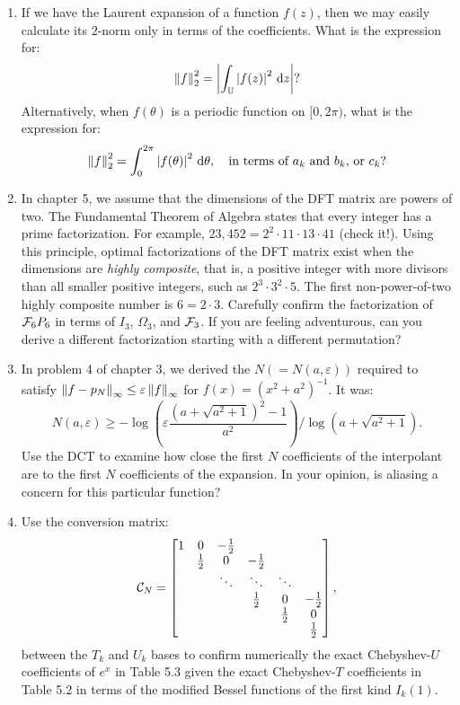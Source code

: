 \documentclass[11pt,letterpaper]{article}
\begin{document}
\begin{enumerate}

\item If we have the Laurent expansion of a function $f(z)$, then we may easily calculate its $2$-norm only in terms of the coefficients. What is the expression for:
\[
\left\|{f}\right\|_2^2 = \left|{\int_{\mathbb{U}} \left|{f(z)}\right|^2{\rm\,d} z}\right| ?
\]
Alternatively, when $f(\theta)$ is a periodic function on $[0,2\pi)$, what is the expression for:
\[
\left\|{f}\right\|_2^2 = \int_0^{2\pi} \left|{f(\theta)}\right|^2{\rm\,d}\theta,\quad \hbox{in terms of $a_k$ and $b_k$, or $c_k$?}
\]

\item In chapter 5, we assume that the dimensions of the DFT matrix are powers of two. The Fundamental Theorem of Algebra states that every integer has a prime factorization. For example, $23,452 = 2^2\cdot11\cdot13\cdot41$ (check it!). Using this principle, optimal factorizations of the DFT matrix exist when the dimensions are {\em highly composite}, that is, a positive integer with more divisors than all smaller positive integers, such as $2^3\cdot3^2\cdot5$. The first non-power-of-two highly composite number is $6 = 2\cdot3$. Carefully confirm the factorization of $\mathcal{F}_6P_6$ in terms of $I_3$, $\Omega_3$, and $\mathcal{F}_3$. If you are feeling adventurous, can you derive a different factorization starting with a different permutation?

\item In problem 4 of chapter 3, we derived the $N(=N(a,\varepsilon))$ required to satisfy $\left\|{f-p_N}\right\|_\infty \le \varepsilon \left\|{f}\right\|_\infty$ for $f(x) = (x^2+a^2)^{-1}$. It was:
\[
N(a,\varepsilon) \ge -\log\left(\varepsilon\dfrac{(a+\sqrt{a^2+1})^2-1}{a^2}\right)/\log(a+\sqrt{a^2+1}).
\]
Use the DCT to examine how close the first $N$ coefficients of the interpolant are to the first $N$ coefficients of the expansion. In your opinion, is aliasing a concern for this particular function?

\item Use the conversion matrix:
\[
\mathcal{C}_N = \begin{bmatrix}
1 & 0 & -\tfrac{1}{2}\\
& \tfrac{1}{2} & 0 & -\tfrac{1}{2}\\
& & \ddots & \ddots & \ddots\\
& & & \tfrac{1}{2} & 0 & -\tfrac{1}{2}\\
& & & & \tfrac{1}{2} & 0\\
& & & & & \tfrac{1}{2}\\
\end{bmatrix},
\]
between the $T_k$ and $U_k$ bases to confirm numerically the exact Chebyshev-$U$ coefficients of $e^x$ in Table 5.3 given the exact Chebyshev-$T$ coefficients in Table 5.2 in terms of the modified Bessel functions of the first kind $I_k(1)$.

\end{enumerate}
\end{document}
